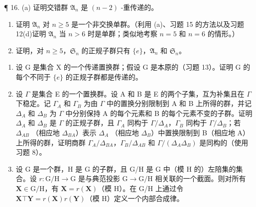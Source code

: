 ¶ 16. (a) 证明交错群 \(\mathfrak{A}_n\) 是 \((n - 2)\) -重传递的。

\begin{enumerate}
\def\labelenumi{(\alph{enumi})}
\setcounter{enumi}{1}
\item
  证明 \(\mathfrak{A}_n\) 对 \(n \geqslant 5\) 是一个非交换单群。（利用 (a)、习题 15 的方法以及习题 12(d)证明 \(\mathfrak{A}_n\) 当 \(n > 6\) 时是单群；类似地考察 \(n = 5\) 和 \(n = 6\) 的情形。）
\item
  证明，对 \(n \geqslant 5\)，\(\mathfrak{S}_n\) 的正规子群只有 \(\{e\}\)，\(\mathfrak{A}_n\) 和 \(\mathfrak{S}_n\)。
\end{enumerate}

\begin{enumerate}
\def\labelenumi{\arabic{enumi}。}
\setcounter{enumi}{16}
\item
  设 G 是集合 X 的一个传递置换群；假设 G 是本原的（习题 13）。证明 G 的每个不同于 \(\{e\}\) 的正规子群都是传递的。
\item
  设 \(\Gamma\) 是集合 E 的一个置换群。设 A 和 B 是 E 的两个子集，互为补集且在 \(\Gamma\) 下稳定。记 \(\Gamma_{A}\) 和 \(\Gamma_{B}\) 为由 \(\Gamma\) 中的置换分别限制到 A 和 B 上所得的群，并记 \(\Delta_{A}\) 和 \(\Delta_{B}\) 为 \(\Gamma\) 中分别保持 A 的每个元素和 B 的每个元素不变的子群。证明 \(\Delta_{A}\) 和 \(\Delta_{B}\) 是 \(\Gamma\) 的正规子群，且 \(\Gamma_{A}\) 同构于 \(\Gamma/\Delta_{A}\)，\(\Gamma_{B}\) 同构于 \(\Gamma/\Delta_{B}\)；若 \(\Delta_{AB}\) （相应地 \(\Delta_{BA}\)）表示 \(\Delta_{A}\) （相应地 \(\Delta_{B}\)）中置换限制到 B（相应地 A）上所得的群，证明商群 \(\Gamma_{A}/\Delta_{BA}\)，\(\Gamma_{B}/\Delta_{AB}\) 和 \(\Gamma/(\Delta_{A}\Delta_{B})\) 是同构的（使用习题 8）。
\item
  设 G 是一个群，H 是 G 的子群，且 G/H 是 G 中（模 H 的）左陪集的集合。设 \(r: \mathrm{G} / \mathrm{H} \to \mathrm{G}\) 是与典范投影 \(\mathrm{G} \to \mathrm{G} / \mathrm{H}\) 相关联的一个截面。则对所有 \(\mathbf{X} \in \mathrm{G} / \mathrm{H}\)，有 \(\mathbf{X} = r(\mathbf{X})\)（模 H）。在 G/H 上通过令 \(\mathbf{X} \top \mathbf{Y} = r(\mathbf{X})r(\mathbf{Y})\)（模 H）定义一个内部合成律。
\end{enumerate}

